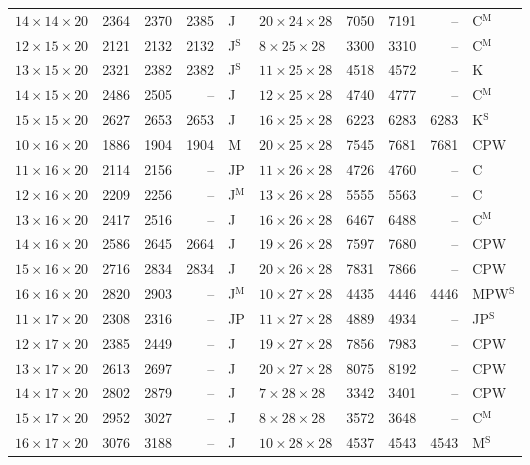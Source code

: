 \begin{longtable}{@{}lrrrl@{\hspace{6mm}}lrrrl@{}}
$14{\times}14{\times}20$ & 2364 & 2370 & 2385 & J & $20{\times}24{\times}28$ & 7050 & 7191 & -- & C$^{\mathrm{M}}$\\
$12{\times}15{\times}20$ & 2121 & 2132 & 2132 & J$^{\mathrm{S}}$ & $8{\times}25{\times}28$ & 3300 & 3310 & -- & C$^{\mathrm{M}}$\\
$13{\times}15{\times}20$ & 2321 & 2382 & 2382 & J$^{\mathrm{S}}$ & $11{\times}25{\times}28$ & 4518 & 4572 & -- & K\\
$14{\times}15{\times}20$ & 2486 & 2505 & -- & J & $12{\times}25{\times}28$ & 4740 & 4777 & -- & C$^{\mathrm{M}}$\\
$15{\times}15{\times}20$ & 2627 & 2653 & 2653 & J & $16{\times}25{\times}28$ & 6223 & 6283 & 6283 & K$^{\mathrm{S}}$\\
$10{\times}16{\times}20$ & 1886 & 1904 & 1904 & M & $20{\times}25{\times}28$ & 7545 & 7681 & 7681 & CPW\\
$11{\times}16{\times}20$ & 2114 & 2156 & -- & JP & $11{\times}26{\times}28$ & 4726 & 4760 & -- & C\\
$12{\times}16{\times}20$ & 2209 & 2256 & -- & J$^{\mathrm{M}}$ & $13{\times}26{\times}28$ & 5555 & 5563 & -- & C\\
$13{\times}16{\times}20$ & 2417 & 2516 & -- & J & $16{\times}26{\times}28$ & 6467 & 6488 & -- & C$^{\mathrm{M}}$\\
$14{\times}16{\times}20$ & 2586 & 2645 & 2664 & J & $19{\times}26{\times}28$ & 7597 & 7680 & -- & CPW\\
$15{\times}16{\times}20$ & 2716 & 2834 & 2834 & J & $20{\times}26{\times}28$ & 7831 & 7866 & -- & CPW\\
$16{\times}16{\times}20$ & 2820 & 2903 & -- & J$^{\mathrm{M}}$ & $10{\times}27{\times}28$ & 4435 & 4446 & 4446 & MPW$^{\mathrm{S}}$\\
$11{\times}17{\times}20$ & 2308 & 2316 & -- & JP & $11{\times}27{\times}28$ & 4889 & 4934 & -- & JP$^{\mathrm{S}}$\\
$12{\times}17{\times}20$ & 2385 & 2449 & -- & J & $19{\times}27{\times}28$ & 7856 & 7983 & -- & CPW\\
$13{\times}17{\times}20$ & 2613 & 2697 & -- & J & $20{\times}27{\times}28$ & 8075 & 8192 & -- & CPW\\
$14{\times}17{\times}20$ & 2802 & 2879 & -- & J & $7{\times}28{\times}28$ & 3342 & 3401 & -- & CPW\\
$15{\times}17{\times}20$ & 2952 & 3027 & -- & J & $8{\times}28{\times}28$ & 3572 & 3648 & -- & C$^{\mathrm{M}}$\\
$16{\times}17{\times}20$ & 3076 & 3188 & -- & J & $10{\times}28{\times}28$ & 4537 & 4543 & 4543 & M$^{\mathrm{S}}$\\

\end{longtable}

